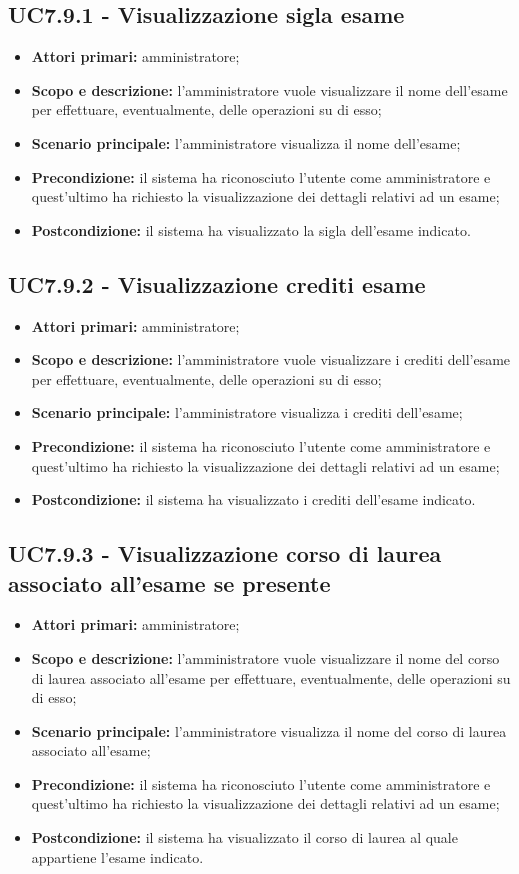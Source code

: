 \documentclass[AnalisiDeiRequisiti.tex]{subfiles}
\begin{document}
\subsection{UC7.9.1 - Visualizzazione sigla esame}
\begin{itemize}
	\item \textbf{Attori primari:} amministratore;
	\item \textbf{Scopo e descrizione:} l'amministratore vuole visualizzare il nome dell'esame per effettuare, eventualmente, delle operazioni su di esso;
	\item \textbf{Scenario principale:} l'amministratore visualizza il nome dell'esame;
	\item \textbf{Precondizione:} il sistema ha riconosciuto l'utente come amministratore e quest'ultimo ha richiesto la visualizzazione dei dettagli relativi ad un esame; 
	\item \textbf{Postcondizione:} il sistema ha visualizzato la sigla dell'esame indicato.
\end{itemize}
\subsection{UC7.9.2 - Visualizzazione crediti esame}
\begin{itemize}
	\item \textbf{Attori primari:} amministratore;
	\item \textbf{Scopo e descrizione:} l'amministratore vuole visualizzare i crediti dell'esame per effettuare, eventualmente, delle operazioni su di esso;
	\item \textbf{Scenario principale:} l'amministratore visualizza i crediti dell'esame;
	\item \textbf{Precondizione:} il sistema ha riconosciuto l'utente come amministratore e quest'ultimo ha richiesto la visualizzazione dei dettagli relativi ad un esame; 
	\item \textbf{Postcondizione:} il sistema ha visualizzato i crediti dell'esame indicato.
\end{itemize}
\subsection{UC7.9.3 - Visualizzazione corso di laurea associato all'esame se presente}
\begin{itemize}
	\item \textbf{Attori primari:} amministratore;
	\item \textbf{Scopo e descrizione:} l'amministratore vuole visualizzare il nome del corso di laurea associato all'esame per effettuare, eventualmente, delle operazioni su di esso;
	\item \textbf{Scenario principale:} l'amministratore visualizza il nome del corso di laurea associato all'esame;
	\item \textbf{Precondizione:} il sistema ha riconosciuto l'utente come amministratore e quest'ultimo ha richiesto la visualizzazione dei dettagli relativi ad un esame; 
	\item \textbf{Postcondizione:} il sistema ha visualizzato il corso di laurea al quale appartiene l'esame indicato.
\end{itemize}
\end{document}
